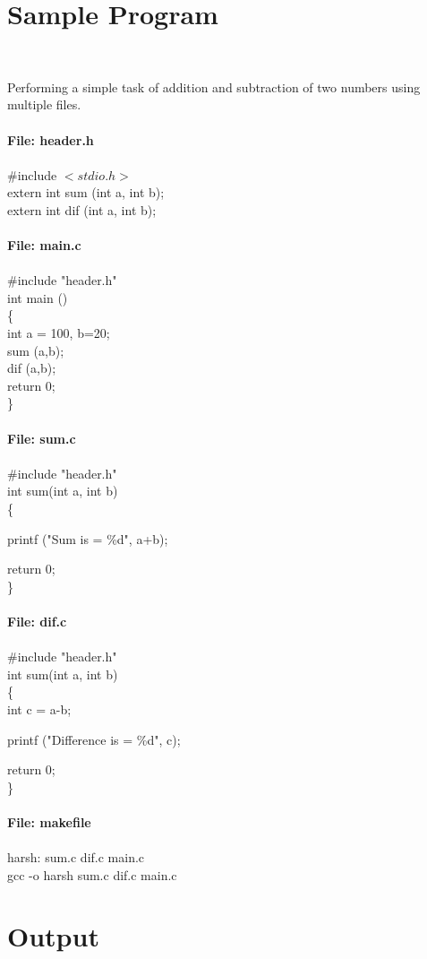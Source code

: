 \documentclass[12pt, a4paper, twoside]{report}
\begin{document}
    \section{{Sample Program}} 
    \\
    \large
    {Performing a simple task of addition and subtraction of two numbers using multiple files.\\ \\   
    \textbf {File: header.h}\\ \\
    \#include $<stdio.h>$\\
    extern int sum (int a, int b);\\
    extern int dif (int a, int b);\\ \\
    \textbf {File: main.c}\\ \\
    \#include "header.h"\\
    int main ()\\
    \{\\
        int a = 100, b=20;\\
        sum (a,b);\\
        dif (a,b);\\
        return 0;\\
    \}\\ \\
    \textbf {File: sum.c}\\ \\
    \#include "header.h"\\
    int sum(int a, int b)\\
   \{
    
        
        printf ("Sum is = \%d\n", a+b); 
        
        return 0;\\
    \}\\ \\
    \textbf {File: dif.c}\\ \\
    \#include "header.h"\\
    int sum(int a, int b)\\
    \{\\
    
        int c = a-b;
        
        printf ("Difference is = \%d\n", c); 
        
        return 0;\\
    \}\\ \\
    \textbf {File: makefile}\\ \\
    harsh: sum.c dif.c main.c\\
	gcc -o harsh sum.c dif.c main.c\\
    
\section{Output}} 
\end{document}
